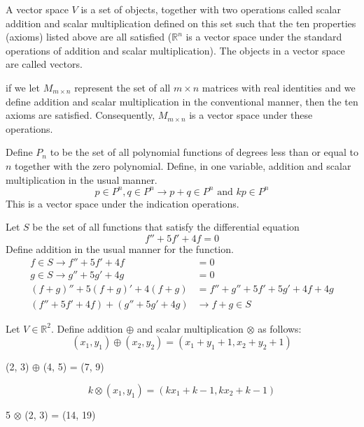 \documentclass[12pt]{article}
\begin{document}
\begin{definition} A vector space $V$ is a set of objects, together with two operations called scalar addition and scalar multiplication defined on this set such that the ten properties (axioms) listed above are all satisfied ($\mathbb{R}^n$ is a vector space under the standard operations of addition and scalar multiplication). The objects in a vector space are called vectors. \end{definition} 
if we let $M_{m \times n}$ represent the set of all $m \times n$ matrices with real identities and we define addition and scalar multiplication in the conventional manner, then the ten axioms are satisfied. Consequently, $M_{m \times n}$ is a vector space under these operations. 
\begin{definition} Define $P_n$ to be the set of all polynomial functions of degrees less than or equal to $n$ together with the zero polynomial. Define, in one variable, addition and scalar multiplication in the usual manner. $$ p \in P^n, q \in P^n \rightarrow p + q \in P^n \text{ and } kp \in P^n $$ This is a vector space under the indication operations. \end{definition} 
\begin{example} Let $S$ be the set of all functions that satisfy the differential equation $$ f'' + 5f' + 4f = 0$$ Define addition in the usual manner for the function. $$ \begin{aligned} f \in S \rightarrow f'' + 5f' + 4f &= 0 \\ g \in S \rightarrow g'' + 5g' + 4g &= 0 \\ (f + g)'' + 5(f + g)' + 4(f + g) &= f'' + g'' + 5f' + 5g' + 4f + 4g \\ (f'' + 5f' + 4f) + (g'' + 5g' + 4g)& \rightarrow f + g \in S \end{aligned} $$ \end{example} 
\begin{example} Let $V \in \mathbb{R}^2$. Define addition $\oplus$ and scalar multiplication $\otimes$ as follows: $$(x_1, y_1) \oplus (x_2, y_2) = (x_1 + y_1 + 1, x_2 + y_2 + 1) $$ \end{example} \begin{example} (2, 3) $\oplus$ (4, 5) = (7, 9) \end{example} $$ k \otimes (x_1, y_1) = (kx_1 + k -1, kx_2 + k - 1) $$ \begin{example} 5 $\otimes$ (2, 3) = (14, 19) \end{example} 
\end{document}
